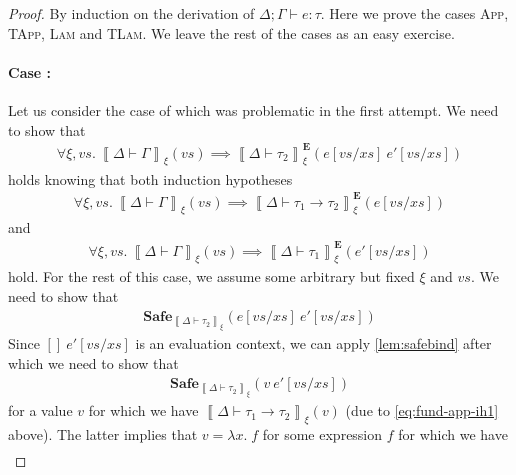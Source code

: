 \documentclass{article}
\newcommand{\empectx}{[]}
\newcommand{\semtyp}[3]{\left\llbracket #2 \vdash #3 \right\rrbracket_{#1}}
\newcommand{\semErel}[1]{#1^{\textbf{E}}}
\newcommand{\semenv}{\xi}
\newcommand{\Tctx}{\Gamma}
\newcommand{\CtxTps}{\Delta}
\newcommand{\expr}{e}
\newcommand{\exprB}{f}
\newcommand{\val}{v}
\newcommand{\var}{x}
\newcommand{\typ}{\tau}
\newcommand{\typed}[4]{#1; #2 \vdash #3 : #4}
\newcommand{\Safe}[1]{\textbf{Safe}_{#1}}
\begin{document}
\begin{proof}
By induction on the derivation of $\typed{\CtxTps}{\Tctx}{\expr}{\typ}$.
Here we prove the cases \textsc{App}, \textsc{TApp},
\textsc{Lam} and \textsc{TLam}.
We leave the rest of the cases as an easy exercise.

\paragraph{Case :}
Let us consider the case of  which was problematic in the first attempt.
We need to show that
\begin{align}
  \label{eq:fund-app-main}
  \forall \semenv, \mathit{vs}.~\semtyp{\semenv}{\CtxTps}{\Tctx}(\mathit{vs}) \implies
  \semErel{\semtyp{\semenv}{\CtxTps}{\typ_2}}(\expr[\mathit{vs}/\mathit{xs}]~\expr'[\mathit{vs}/\mathit{xs}])
\end{align}
holds knowing that both induction hypotheses
\begin{align}
  \label{eq:fund-app-ih1}
  \forall \semenv, \mathit{vs}.~\semtyp{\semenv}{\CtxTps}{\Tctx}(\mathit{vs}) \implies \semErel{\semtyp{\semenv}{\CtxTps}{\typ_1 \to \typ_2}}(\expr[\mathit{vs}/\mathit{xs}])
\end{align}
and
\begin{align}
  \label{eq:fund-app-ih2}
  \forall \semenv, \mathit{vs}.~\semtyp{\semenv}{\CtxTps}{\Tctx}(\mathit{vs}) \implies
  \semErel{\semtyp{\semenv}{\CtxTps}{\typ_1}}(\expr'[\mathit{vs}/\mathit{xs}])
\end{align}
hold.
For the rest of this case, we assume some arbitrary but fixed $\semenv$ and $\mathit{vs}$.
We need to show that
\begin{align}
  \label{eq:fund-app-to-show-1}
  \Safe{\semtyp{\semenv}{\CtxTps}{\typ_2}}(\expr[\mathit{vs}/\mathit{xs}]~\expr'[\mathit{vs}/\mathit{xs}])
\end{align}
Since $\empectx~\expr'[\mathit{vs}/\mathit{xs}]$ is an evaluation context, we can apply \ref{lem:safebind} after which we need to show that
\begin{align}
  \label{eq:fund-app-to-show-2}
  \Safe{\semtyp{\semenv}{\CtxTps}{\typ_2}}(\val~\expr'[\mathit{vs}/\mathit{xs}])
\end{align}
for a value $\val$ for which we have $\semtyp{\semenv}{\CtxTps}{\typ_1 \to \typ_2}(\val)$ (due to \eqref{eq:fund-app-ih1} above).
The latter implies that $\val = \lambda \var.\; \exprB$ for some expression $\exprB$ for which we have
\begin{align}

\end{align}
\end{proof}
\end{document}
